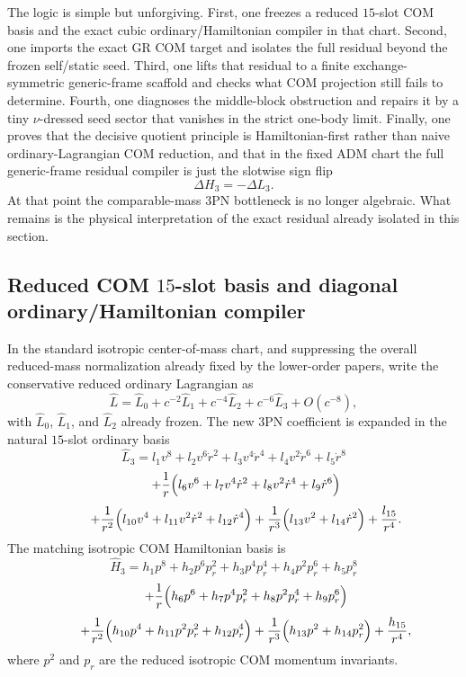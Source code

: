 \documentclass[11pt]{article}
\begin{document}
The logic is simple but unforgiving.  First, one freezes a reduced $15$-slot COM
basis and the exact cubic ordinary/Hamiltonian compiler in that chart.  Second,
one imports the exact GR COM target and isolates the full residual beyond the
frozen self/static seed.  Third, one lifts that residual to a finite
exchange-symmetric generic-frame scaffold and checks what COM projection still
fails to determine.  Fourth, one diagnoses the middle-block obstruction and
repairs it by a tiny $\nu$-dressed seed sector that vanishes in the strict
one-body limit.  Finally, one proves that the decisive quotient principle is
Hamiltonian-first rather than naive ordinary-Lagrangian COM reduction, and that
in the fixed ADM chart the full generic-frame residual compiler is just the
slotwise sign flip
\[
\Delta H_3=-\Delta L_3.
\]
At that point the comparable-mass $3$PN bottleneck is no longer algebraic.  What
remains is the physical interpretation of the exact residual already isolated in
this section.

\subsection{Reduced COM \texorpdfstring{$15$}{15}-slot basis and diagonal ordinary/Hamiltonian compiler}
\label{sec:compmass-com-basis}

In the standard isotropic center-of-mass chart, and suppressing the overall
reduced-mass normalization already fixed by the lower-order papers, write the
conservative reduced ordinary Lagrangian as
\[
\hat L=\hat L_0+c^{-2}\hat L_1+c^{-4}\hat L_2+c^{-6}\hat L_3+O(c^{-8}),
\]
with $\hat L_0$, $\hat L_1$, and $\hat L_2$ already frozen.  The new $3$PN
coefficient is expanded in the natural $15$-slot ordinary basis
\[
\hat L_3
= l_1 v^8 + l_2 v^6\dot r^2 + l_3 v^4\dot r^4 + l_4 v^2\dot r^6 + l_5\dot r^8
\]
\[
\qquad
+\frac1r\Bigl(l_6 v^6 + l_7 v^4\dot r^2 + l_8 v^2\dot r^4 + l_9\dot r^6\Bigr)
\]
\[
\qquad
+\frac1{r^2}\Bigl(l_{10} v^4 + l_{11} v^2\dot r^2 + l_{12}\dot r^4\Bigr)
+\frac1{r^3}\Bigl(l_{13} v^2 + l_{14}\dot r^2\Bigr)
+\frac{l_{15}}{r^4}.
\]
The matching isotropic COM Hamiltonian basis is
\[
\hat H_3
= h_1 p^8 + h_2 p^6p_r^2 + h_3 p^4p_r^4 + h_4 p^2p_r^6 + h_5 p_r^8
\]
\[
\qquad
+\frac1r\Bigl(h_6 p^6 + h_7 p^4p_r^2 + h_8 p^2p_r^4 + h_9 p_r^6\Bigr)
\]
\[
\qquad
+\frac1{r^2}\Bigl(h_{10} p^4 + h_{11} p^2p_r^2 + h_{12} p_r^4\Bigr)
+\frac1{r^3}\Bigl(h_{13} p^2 + h_{14} p_r^2\Bigr)
+\frac{h_{15}}{r^4},
\]
where $p^2$ and $p_r$ are the reduced isotropic COM momentum invariants.
\end{document}
